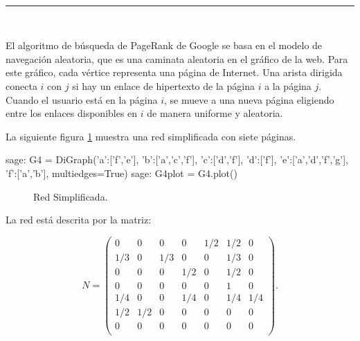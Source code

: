 \begin{center}
	{\fboxrule=4pt } \\
	\rule{15cm}{0pt} \\
\end{center}

\begin{ejer}
    \par El algoritmo de búsqueda de PageRank de Google se basa en el modelo de navegación aleatoria, que es una caminata aleatoria en el gráfico de la web. 
    Para este gráfico, cada vértice representa una página de Internet. Una arista dirigida conecta $i$ con $j$ si hay un enlace de hipertexto de la página $i$ a la página $j$. 
    Cuando el usuario está en la página $i$, se mueve a una nueva página eligiendo entre los enlaces disponibles en $i$ de manera uniforme y aleatoria.
    \par La siguiente figura \ref{fig:redSimplificada} muestra una red simplificada con siete páginas.
\end{ejer}

\begin{sagecommandline}
    sage: G4 = DiGraph({'a':['f','e'], 'b':['a','c','f'], 'c':['d','f'], 'd':['f'], 'e':['a','d','f','g'], 'f':['a','b']}, multiedges=True)
    sage: G4plot = G4.plot()
\end{sagecommandline}
\begin{figure}[H]
	\centering
	\caption{Red Simplificada.}
    \label{fig:redSimplificada}
\end{figure}


\begin{ejer}
    \par La red está descrita por la matriz:
\end{ejer}
\begin{equation}
    N =
    \begin{pmatrix}
    0 & 0 & 0 & 0 & 1/2 & 1/2 & 0\\
    1/3 & 0 & 1/3 & 0 & 0 & 1/3 & 0\\
    0 & 0 & 0 & 1/2 & 0 & 1/2 & 0\\
    0 & 0 & 0 & 0 & 0 & 1 & 0 \\
    1/4 & 0 & 0 & 1/4 & 0 & 1/4 & 1/4 \\
    1/2 & 1/2 & 0 & 0 & 0 & 0 & 0 \\
    0 & 0 & 0 & 0 & 0 & 0 & 0 \\
    \end{pmatrix}
    .
\end{equation}

